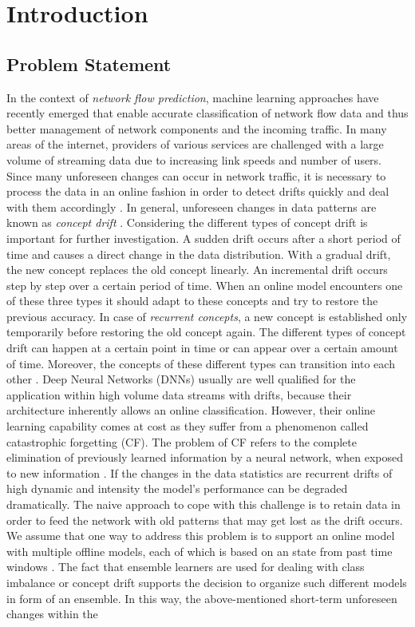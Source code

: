 \documentclass[conference]{IEEEtran}
\begin{document}
\IEEEpeerreviewmaketitle


\section{Introduction}\label{sec:introduction}
\subsection{Problem Statement}\label{sec:problem_statement}
In the context of \textit{network flow prediction}, machine learning approaches have recently emerged that enable accurate classification of network flow data and thus better management of network components and the incoming traffic. In many areas of the internet, providers of various services are challenged with a large volume of streaming data due to increasing link speeds and number of users. Since many unforeseen changes can occur in network traffic, it is necessary to process the data in an online fashion in order to detect drifts quickly and deal with them accordingly \cite{gama_concept_drift}. In general, unforeseen changes in data patterns are known as \textit{concept drift} \cite{gama_concept_drift}. Considering the different types of concept drift is important for further investigation. A sudden drift occurs after a short period of time and causes a direct change in the data distribution. With a gradual drift, the new concept replaces the old concept linearly. An incremental drift occurs step by step over a certain period of time. When an online model encounters one of these three types it should adapt to these concepts and try to restore the previous accuracy. In case of \textit{recurrent concepts}, a new concept is established only temporarily before restoring the old concept again. The different types of concept drift can happen at a certain point in time or can appear over a certain amount of time. Moreover, the concepts of these different types can transition into each other \cite{lu_concept_drift}. Deep Neural Networks (DNNs) usually are well qualified for the application within high volume data streams with drifts, because their architecture inherently allows an online classification. However, their online learning capability comes at cost as they suffer from a phenomenon called catastrophic forgetting (CF). The problem of CF refers to the complete elimination of previously learned information by a neural network, when exposed to new information \cite{MCC_1989, RAT_1990}. If the changes in the data statistics are recurrent drifts of high dynamic and intensity the model's performance can be degraded dramatically. The naive approach to cope with this challenge is to retain data in order to feed the network with old patterns that may get lost as the drift occurs. We assume that one way to address this problem is to support an online model with multiple offline models, each of which is based on an state from past time windows \cite{hardegen_predicting_2020}. The fact that ensemble learners are used for dealing with class imbalance or concept drift \cite{sage_ensemble_learning} supports the decision to organize such different models in form of an ensemble. In this way, the above-mentioned short-term unforeseen changes within the 
\end{document}
